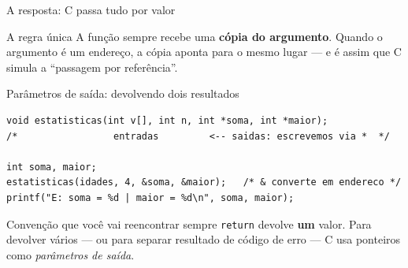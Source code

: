 \documentclass[aspectratio=169]{beamer}
\begin{document}
\begin{frame}{A resposta: C passa tudo por valor}
  \begin{center}
  \end{center}
  \begin{block}{A regra única}
    A função sempre recebe uma \textbf{cópia do argumento}. Quando o argumento é
    um endereço, a cópia aponta para o mesmo lugar --- e é assim que C simula a
    ``passagem por referência''.
  \end{block}
\end{frame}

\begin{frame}[fragile]{Parâmetros de saída: devolvendo dois resultados}
\begin{lstlisting}[numbers=none]
void estatisticas(int v[], int n, int *soma, int *maior);
/*                 entradas         <-- saidas: escrevemos via *  */

int soma, maior;
estatisticas(idades, 4, &soma, &maior);   /* & converte em endereco */
printf("E: soma = %d | maior = %d\n", soma, maior);
\end{lstlisting}
  \begin{block}{Convenção que você vai reencontrar sempre}
    \texttt{return} devolve \textbf{um} valor. Para devolver vários --- ou para
    separar resultado de código de erro --- C usa ponteiros como
    \emph{parâmetros de saída}.
  \end{block}
\end{frame}
\end{document}
